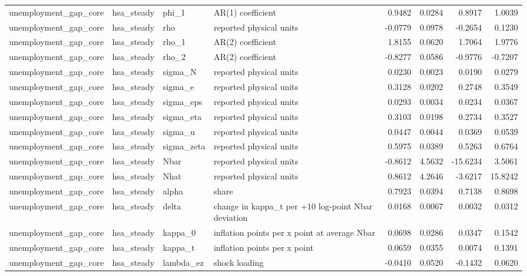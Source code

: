 \begin{tabular}{llllrrrr}
unemployment\_gap\_core & hsa\_steady & phi\_1 & AR(1) coefficient & 0.9482 & 0.0284 & 0.8917 & 1.0039 \\
unemployment\_gap\_core & hsa\_steady & rho & reported physical units & -0.0779 & 0.0978 & -0.2654 & 0.1230 \\
unemployment\_gap\_core & hsa\_steady & rho\_1 & AR(2) coefficient & 1.8155 & 0.0620 & 1.7064 & 1.9776 \\
unemployment\_gap\_core & hsa\_steady & rho\_2 & AR(2) coefficient & -0.8277 & 0.0586 & -0.9776 & -0.7207 \\
unemployment\_gap\_core & hsa\_steady & sigma\_N & reported physical units & 0.0230 & 0.0023 & 0.0190 & 0.0279 \\
unemployment\_gap\_core & hsa\_steady & sigma\_e & reported physical units & 0.3128 & 0.0202 & 0.2748 & 0.3549 \\
unemployment\_gap\_core & hsa\_steady & sigma\_eps & reported physical units & 0.0293 & 0.0034 & 0.0234 & 0.0367 \\
unemployment\_gap\_core & hsa\_steady & sigma\_eta & reported physical units & 0.3103 & 0.0198 & 0.2734 & 0.3527 \\
unemployment\_gap\_core & hsa\_steady & sigma\_u & reported physical units & 0.0447 & 0.0044 & 0.0369 & 0.0539 \\
unemployment\_gap\_core & hsa\_steady & sigma\_zeta & reported physical units & 0.5975 & 0.0389 & 0.5263 & 0.6764 \\
unemployment\_gap\_core & hsa\_steady & Nbar & reported physical units & -0.8612 & 4.5632 & -15.6234 & 3.5061 \\
unemployment\_gap\_core & hsa\_steady & Nhat & reported physical units & 0.8612 & 4.2646 & -3.6217 & 15.8242 \\
unemployment\_gap\_core & hsa\_steady & alpha & share & 0.7923 & 0.0394 & 0.7138 & 0.8698 \\
unemployment\_gap\_core & hsa\_steady & delta & change in kappa\_t per +10 log-point Nbar deviation & 0.0168 & 0.0067 & 0.0032 & 0.0312 \\
unemployment\_gap\_core & hsa\_steady & kappa\_0 & inflation points per x point at average Nbar & 0.0698 & 0.0286 & 0.0347 & 0.1542 \\
unemployment\_gap\_core & hsa\_steady & kappa\_t & inflation points per x point & 0.0659 & 0.0355 & 0.0074 & 0.1391 \\
unemployment\_gap\_core & hsa\_steady & lambda\_ez & shock loading & -0.0410 & 0.0520 & -0.1432 & 0.0620 \\

\end{tabular}
